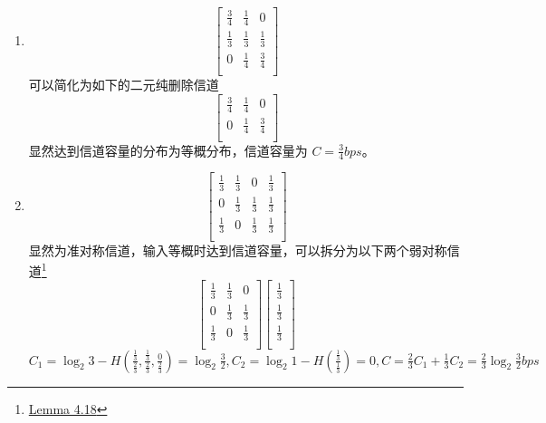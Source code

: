 \documentclass{ctexart}
\begin{document}
\begin{enumerate}
    \item\begin{equation}
        \begin{bmatrix}
            \frac{3}{4} & \frac{1}{4} & 0 \\
            \frac{1}{3} & \frac{1}{3} & \frac{1}{3} \\
            0 & \frac{1}{4} & \frac{3}{4} \\
        \end{bmatrix}
    \end{equation}
    可以简化为如下的二元纯删除信道
    \begin{equation}
        \begin{bmatrix}
            \frac{3}{4} & \frac{1}{4} & 0 \\
            0 & \frac{1}{4} & \frac{3}{4} \\
        \end{bmatrix}
    \end{equation}
    显然达到信道容量的分布为等概分布，信道容量为 $C = \frac{3}{4} bps$。
    \item\begin{equation}
        \begin{bmatrix}
            \frac{1}{3} & \frac{1}{3} & 0 & \frac{1}{3} \\
            0 & \frac{1}{3} & \frac{1}{3} & \frac{1}{3} \\
            \frac{1}{3} & 0 & \frac{1}{3} & \frac{1}{3} \\
        \end{bmatrix}
    \end{equation}
    显然为准对称信道，输入等概时达到信道容量，可以拆分为以下两个弱对称信道\footnote{\href{http://shannon.cm.nctu.edu.tw/it/c1-4s13.pdf}{Lemma 4.18}}
    \begin{equation}
        \begin{bmatrix}
            \frac{1}{3} & \frac{1}{3} & 0 \\
            0 & \frac{1}{3} & \frac{1}{3} \\
            \frac{1}{3} & 0 & \frac{1}{3} \\
        \end{bmatrix}
        \begin{bmatrix}
            \frac{1}{3} \\
            \frac{1}{3} \\
            \frac{1}{3} \\
        \end{bmatrix}
    \end{equation}
    $C_1 = \log_2 3 - H(\frac{\frac{1}{3}}{\frac{2}{3}}, \frac{\frac{1}{3}}{\frac{2}{3}}, \frac{0}{\frac{2}{3}}) = \log_2\frac{3}{2}, C_2 = \log_2 1 - H(\frac{\frac{1}{3}}{\frac{1}{3}}) = 0, C = \frac{2}{3}C_1 + \frac{1}{3}C_2 = \frac{2}{3}\log_2\frac{3}{2} bps$
\end{enumerate}
\end{document}

